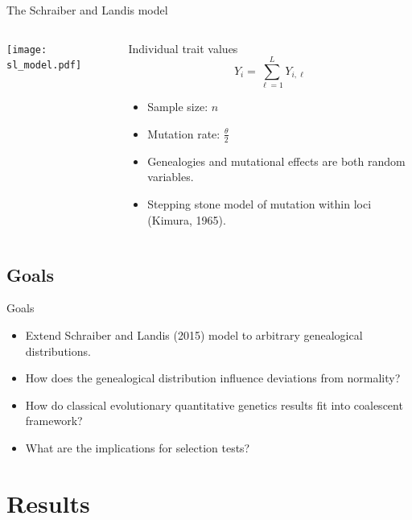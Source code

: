 \documentclass{beamer}
\newcommand{\T}{\frac{\theta}{2}}
\begin{document}
\begin{frame}{The Schraiber and Landis model}
  \begin{columns}
    \begin{column}{0.55\columnwidth}
      \begin{center}
        \texttt{[image: sl\_model.pdf]}
      \end{center}
    \end{column}
    \begin{column}{0.42\columnwidth}
      \begin{block}{Individual trait values}
        \begin{equation*}
          Y_i = \sum_{\ell=1}^L Y_{i,\ell}
        \end{equation*}
      \end{block}
      \begin{itemize}
      \item Sample size: $n$
      \item Mutation rate: $\T$
      \item Genealogies and mutational effects are both random variables.
      \item Stepping stone model of mutation within loci (Kimura, 1965).
      \end{itemize}
    \end{column}
  \end{columns}
\end{frame}

\subsection{Goals}

\begin{frame}{Goals}
  \begin{itemize}
  \item Extend Schraiber and Landis (2015) model to arbitrary genealogical
    distributions.
  \item How does the genealogical distribution influence deviations from
    normality?
  \item How do classical evolutionary quantitative genetics results fit into
    coalescent framework?
  \item What are the implications for selection tests?
  \end{itemize}
\end{frame}

\section{Results}
\end{document}

